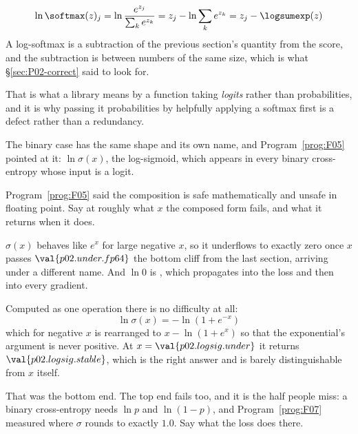 \begin{fr}

\[ \ln \softmax(z)_j = \ln \frac{e^{z_j}}{\sum_k e^{z_k}}
   = z_j - \ln \sum_k e^{z_k} = z_j - \logsumexp(z) \]
A log-softmax is a
subtraction of the previous section's quantity from the score, and the
subtraction is between numbers of the same size, which is what
\S\ref{sec:P02-correct} said to look for.

That is what a library means by a function taking \emph{logits} rather than
probabilities, and it is why passing it probabilities \dash{} by helpfully
applying a softmax first \dash{} is a defect rather than a redundancy.
\end{fr}

\begin{fr}
The binary case has the same shape and its own name, and
Program~\ref{prog:F05} pointed at it: $\ln \sigma(x)$, the log-sigmoid, which
appears in every binary cross-entropy whose input is a logit.

Program~\ref{prog:F05} said the composition is safe mathematically and unsafe
in floating point. Say at roughly what $x$ the composed form fails, and what it
returns when it does.
\nextframe
\end{fr}

\begin{fr}
$\sigma(x)$ behaves like $e^{x}$ for large negative $x$, so it underflows to
exactly zero once $x$ passes $\val{p02.under.fp64}$ \dash{} the bottom cliff
from the last section, arriving under a different name. And $\ln 0$ is
, which propagates into the loss and then into every
gradient.

Computed as one operation there is no difficulty at all:
\[ \ln \sigma(x) = -\ln\!\left(1 + e^{-x}\right) \]
which for negative $x$ is rearranged to $x - \ln(1 + e^{x})$ so that the
exponential's argument is never positive. At $x = \val{p02.logsig.under}$ it
returns $\val{p02.logsig.stable}$, which is the right answer and is barely
distinguishable from $x$ itself.

That was the bottom end. The top end fails too, and it is the half people
miss: a binary cross-entropy needs $\ln p$ and $\ln(1 - p)$, and
Program~\ref{prog:F07} measured where $\sigma$ rounds to exactly $\num{1.0}$.
Say what the loss does there.
\dotline
\nextframe
\end{fr}

